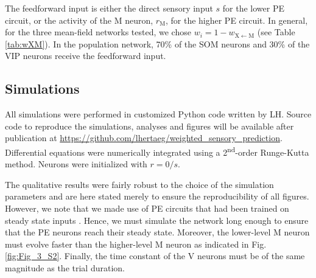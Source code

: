 \documentclass[10pt,a4paper]{article}
\begin{document}
The feedforward input is either the direct sensory input $s$ for the lower PE circuit, or the activity of the M neuron, $r_\mathrm{M}$, for the higher PE circuit. In general, for the three mean-field networks tested, we chose $w_i = 1 - w_\mathrm{X\leftarrow M}$  (see Table \ref{tab:wXM}). In the population network, 70\% of the SOM neurons and 30\% of the VIP neurons receive the feedforward input.


\subsection{Simulations}
%
All simulations were performed in customized Python code written by LH. Source code to reproduce the simulations, analyses and figures will be available after publication at \url{https://github.com/lhertaeg/weighted_sensory_prediction}. Differential equations were numerically integrated using a 2\textsuperscript{nd}-order Runge-Kutta method. Neurons were initialized with $r=0/s$. 

The qualitative results were fairly robust to the choice of the simulation parameters and are here stated merely to ensure the reproducibility of all figures. However, we note that we made use of PE circuits that had been trained on steady state inputs \citep{hertag2022prediction}. Hence, we must simulate the network long enough to ensure that the PE neurons reach their steady state. Moreover, the lower-level M neuron must evolve faster than the higher-level M neuron as indicated in Fig. \ref{fig:Fig_3_S2}. Finally, the time constant of the V neurons must be of the same magnitude as the trial duration.
\end{document}
